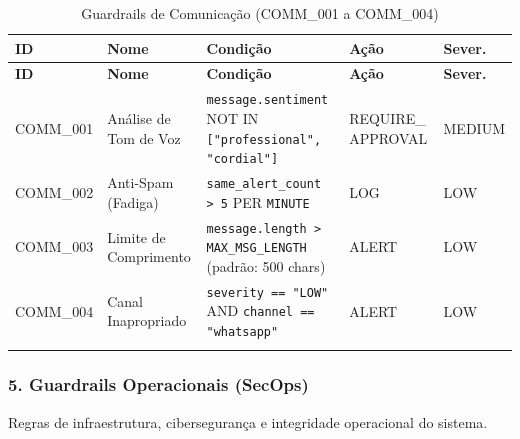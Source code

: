 \documentclass[12pt, a4paper]{article}
\begin{document}
{\small
\begin{longtable}{|p{2cm}|p{2.8cm}|p{5.5cm}|p{2cm}|p{2cm}|}
\hline
\textbf{ID} & \textbf{Nome} & \textbf{Condição} & \textbf{Ação} & \textbf{Sever.} \\ \hline
\endfirsthead
\hline
\textbf{ID} & \textbf{Nome} & \textbf{Condição} & \textbf{Ação} & \textbf{Sever.} \\ \hline
\endhead

COMM\_001 & Análise de Tom de Voz & \texttt{message.sentiment} NOT IN \texttt{["professional", "cordial"]} & REQUIRE\_ APPROVAL & MEDIUM \\ \hline

COMM\_002 & Anti-Spam (Fadiga) & \texttt{same\_alert\_count > 5} PER \texttt{MINUTE} & LOG & LOW \\ \hline

COMM\_003 & Limite de Comprimento & \texttt{message.length > MAX\_MSG\_LENGTH} (padrão: 500 chars) & ALERT & LOW \\ \hline

COMM\_004 & Canal Inapropriado & \texttt{severity == "LOW"} AND \texttt{channel == "whatsapp"} & ALERT & LOW \\ \hline

\caption{Guardrails de Comunicação (COMM\_001 a COMM\_004)}
\end{longtable}
}

\subsubsection{5. Guardrails Operacionais (SecOps)}

Regras de infraestrutura, cibersegurança e integridade operacional do sistema.
\end{document}
